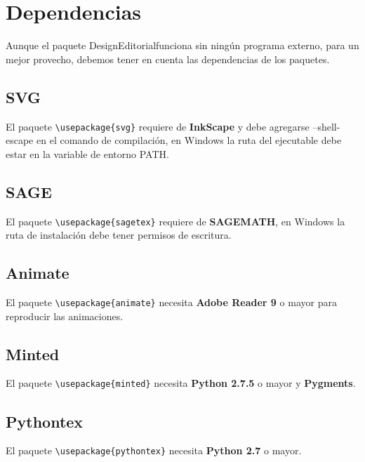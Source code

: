 \chapter{Dependencias}\label{cap:dependencias}
{\justifying
	Aunque el paquete DesignEditorial\printversion\space funciona sin ningún programa externo, para un mejor provecho, debemos tener en cuenta las dependencias de los paquetes.
	\section{SVG}\label{sec:DependenciasSVG}
	El paquete \verb|\usepackage{svg}| requiere de \textbf{InkScape} y debe agregarse --shell-escape en el comando de compilación, en Windows la ruta del ejecutable debe estar en la variable de entorno PATH. 
	\section{SAGE}
	El paquete \verb|\usepackage{sagetex}| requiere de \textbf{SAGEMATH}, en Windows la ruta de instalación debe tener permisos de escritura.
	\section{Animate}
	El paquete \verb|\usepackage{animate}| necesita \textbf{Adobe Reader 9} o mayor para reproducir las animaciones.
	\section{Minted}
	El paquete \verb|\usepackage{minted}| necesita \textbf{Python 2.7.5} o mayor y \textbf{Pygments}.
	\section{Pythontex}
	El paquete \verb|\usepackage{pythontex}| necesita \textbf{Python 2.7} o mayor.
}